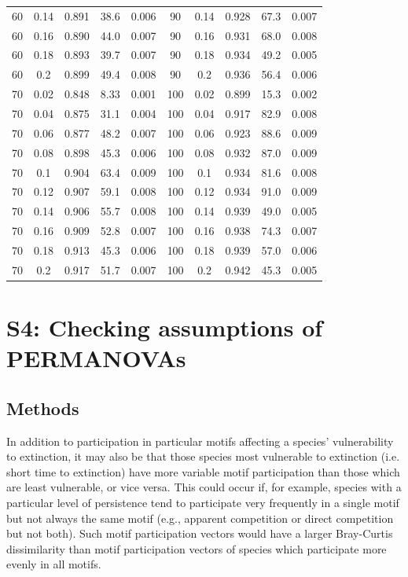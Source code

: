 \documentclass[12pt]{article}
\begin{document}
\begin{table}[hb!]
\begin{tabular}{c c | c | c c ||c c | c | c c |}
                60&0.14&0.891&38.6&0.006	&	90&0.14&0.928&67.3&0.007\\
                60&0.16&0.890&44.0&0.007	&	90&0.16&0.931&68.0&0.008\\
                60&0.18&0.893&39.7&0.007	&	90&0.18&0.934&49.2&0.005\\
                60&0.2&0.899&49.4&0.008	&	90&0.2&0.936&56.4&0.006\\
                70&0.02&0.848&8.33&0.001	&	100&0.02&0.899&15.3&0.002\\
                70&0.04&0.875&31.1&0.004	&	100&0.04&0.917&82.9&0.008\\
                70&0.06&0.877&48.2&0.007	&	100&0.06&0.923&88.6&0.009\\
                70&0.08&0.898&45.3&0.006	&	100&0.08&0.932&87.0&0.009\\
                70&0.1&0.904&63.4&0.009	&	100&0.1&0.934&81.6&0.008\\
                70&0.12&0.907&59.1&0.008	&	100&0.12&0.934&91.0&0.009\\
                70&0.14&0.906&55.7&0.008	&	100&0.14&0.939&49.0&0.005\\
                70&0.16&0.909&52.8&0.007	&	100&0.16&0.938&74.3&0.007\\
                70&0.18&0.913&45.3&0.006	&	100&0.18&0.939&57.0&0.006\\
                70&0.2&0.917&51.7&0.007	&	100&0.2&0.942&45.3&0.005\\
				\hline
			\end{tabular}
			\end{table}

\clearpage


\section*{S4: Checking assumptions of PERMANOVAs}

	\subsection*{Methods}

        
        In addition to participation in particular motifs affecting a species' vulnerability to extinction, it may also be that those species most vulnerable to extinction (i.e. short time to extinction) have more variable motif participation than those which are least vulnerable, or vice versa. 
        This could occur if, for example, species with a particular level of persistence tend to participate very frequently in a single motif but not always the same motif (e.g., apparent competition or direct competition but not both). 
        Such motif participation vectors would have a larger Bray-Curtis dissimilarity than motif participation vectors of species which participate more evenly in all motifs.
\end{document}
